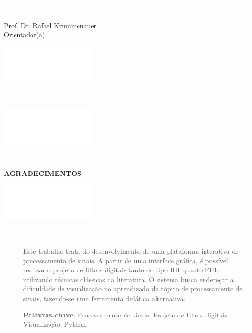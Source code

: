 \documentclass[12pt,a4paper]{report}
\begin{document}
\rule [0cm]{10cm}{0.1pt}\\
Prof. Dr. Rafael Krummenauer\\
Orientador(a)\\[2.41cm]

\thispagestyle{empty}
\clearpage

\begin{minipage}{0.9\linewidth}
  \includegraphics[scale=0.01]{images/branco} 
\end{minipage}\\[21cm]

\begin{minipage}{0.59\linewidth}
  \includegraphics[scale=0.01]{images/branco} 
\end{minipage}
\begin{minipage}{0.4\linewidth}

\end{minipage}\\[18cm]


\thispagestyle{empty}
\clearpage

{
  \center \Large \bf AGRADECIMENTOS
}\\[1cm]

\justifying



\thispagestyle{empty}
\clearpage

\begin{minipage}{0.49\linewidth}
  \includegraphics[scale=0.01]{images/branco} 
\end{minipage}\\[18cm]

\thispagestyle{empty}
\clearpage

\begin{abstract}
  Este trabalho trata do desenvolvimento de uma plataforma interativa de processamento de sinais.
  A partir de uma interface gráfica, é possível realizar o projeto de filtros digitais tanto do tipo
  IIR quanto FIR, utilizando técnicas clássicas da literatura. O sistema busca endereçar a dificuldade
  de visualização no aprendizado do tópico de processamento de sinais, fazendo-se uma ferramenta didática
  alternativa.

  \textbf{Palavras-chave}: Processamento de sinais. Projeto de filtros digitais. Visualização. Python.
\end{abstract}
\end{document}
